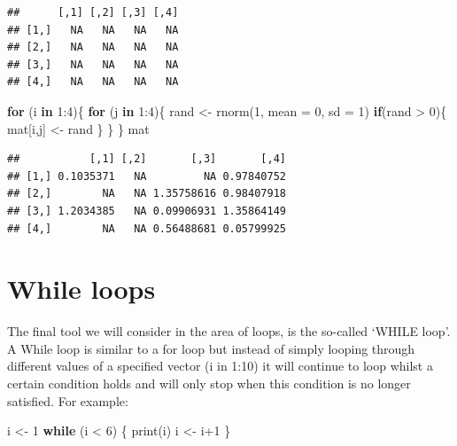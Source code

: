 \documentclass[
]{book}
\newenvironment{Shaded}{\begin{snugshade}}{\end{snugshade}}
\newcommand{\AttributeTok}[1]{\textcolor[rgb]{0.77,0.63,0.00}{#1}}
\newcommand{\ControlFlowTok}[1]{\textcolor[rgb]{0.13,0.29,0.53}{\textbf{#1}}}
\newcommand{\DecValTok}[1]{\textcolor[rgb]{0.00,0.00,0.81}{#1}}
\newcommand{\FunctionTok}[1]{\textcolor[rgb]{0.00,0.00,0.00}{#1}}
\newcommand{\NormalTok}[1]{#1}
\newcommand{\OtherTok}[1]{\textcolor[rgb]{0.56,0.35,0.01}{#1}}
\newcommand{\SpecialCharTok}[1]{\textcolor[rgb]{0.00,0.00,0.00}{#1}}
\theoremstyle{definition}
\theoremstyle{definition}
\theoremstyle{definition}
\theoremstyle{definition}
\theoremstyle{remark}
\begin{document}
\begin{verbatim}
##      [,1] [,2] [,3] [,4]
## [1,]   NA   NA   NA   NA
## [2,]   NA   NA   NA   NA
## [3,]   NA   NA   NA   NA
## [4,]   NA   NA   NA   NA
\end{verbatim}

\begin{Shaded}
\begin{Highlighting}[]
\ControlFlowTok{for}\NormalTok{ (i }\ControlFlowTok{in} \DecValTok{1}\SpecialCharTok{:}\DecValTok{4}\NormalTok{)\{}
  \ControlFlowTok{for}\NormalTok{ (j }\ControlFlowTok{in} \DecValTok{1}\SpecialCharTok{:}\DecValTok{4}\NormalTok{)\{}
\NormalTok{  rand }\OtherTok{\textless{}{-}} \FunctionTok{rnorm}\NormalTok{(}\DecValTok{1}\NormalTok{, }\AttributeTok{mean =} \DecValTok{0}\NormalTok{, }\AttributeTok{sd =} \DecValTok{1}\NormalTok{)}
  \ControlFlowTok{if}\NormalTok{(rand }\SpecialCharTok{\textgreater{}} \DecValTok{0}\NormalTok{)\{}
\NormalTok{    mat[i,j] }\OtherTok{\textless{}{-}}\NormalTok{ rand}
\NormalTok{  \}}
\NormalTok{  \}}
\NormalTok{\}}
\NormalTok{mat}
\end{Highlighting}
\end{Shaded}

\begin{verbatim}
##           [,1] [,2]       [,3]       [,4]
## [1,] 0.1035371   NA         NA 0.97840752
## [2,]        NA   NA 1.35758616 0.98407918
## [3,] 1.2034385   NA 0.09906931 1.35864149
## [4,]        NA   NA 0.56488681 0.05799925
\end{verbatim}

\hypertarget{while-loops}{%
\section{While loops}\label{while-loops}}

The final tool we will consider in the area of loops, is the so-called `WHILE loop'. A While loop is similar to a for loop but instead of simply looping through different values of a specified vector (i in 1:10) it will continue to loop whilst a certain condition holds and will only stop when this condition is no longer satisfied. For example:

\begin{Shaded}
\begin{Highlighting}[]
\NormalTok{i }\OtherTok{\textless{}{-}} \DecValTok{1}
\ControlFlowTok{while}\NormalTok{ (i }\SpecialCharTok{\textless{}} \DecValTok{6}\NormalTok{) \{}
  \FunctionTok{print}\NormalTok{(i)}
\NormalTok{  i }\OtherTok{\textless{}{-}}\NormalTok{ i}\SpecialCharTok{+}\DecValTok{1}
\NormalTok{\}}
\end{Highlighting}
\end{Shaded}
\end{document}
